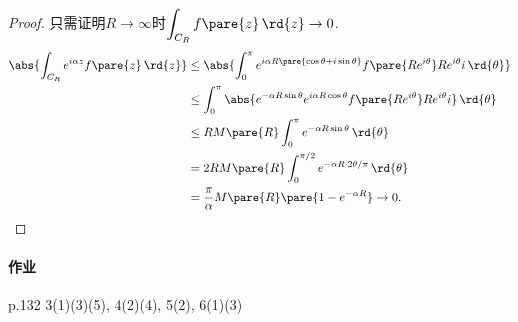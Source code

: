 \documentclass[../ComplexVariable.tex]{subfiles}
\begin{document}
\begin{proof}
    只需证明$R\rightarrow\infty$时$\displaystyle \int_{C_R}f\pare{z}\,\rd{z} \rightarrow 0$.
    \begin{align*}
        \abs{\int_{C_R} e^{i\alpha z}f\pare{z}\,\rd{z}} &\le \abs{\int_0^{\pi} e^{i\alpha R\pare{\cos\theta + i\sin\theta}}f\pare{Re^{i\theta}}Re^{i\theta}i\,\rd{\theta}} \\
        &\le \int_0^\pi \abs{e^{-\alpha R\sin\theta} e^{i\alpha R\cos\theta} f\pare{Re^{i\theta}} Re^{i\theta}i}\,\rd{\theta} \\
        &\le RM\pare{R}\int_0^\pi e^{-\alpha R\sin\theta}\,\rd{\theta} \\
        &= 2RM\pare{R} \int_0^{\pi/2} e^{-\alpha R\cdot 2 \theta/\pi}\,\rd{\theta} \\
        &= \frac{\pi}{\alpha}M\pare{R}\pare{1-e^{-\alpha R}} \rightarrow 0. \qedhere
    \end{align*}
\end{proof}

\paragraph{作业} %
\label{par:作业}

p.132 3(1)(3)(5), 4(2)(4), 5(2), 6(1)(3)

\end{document}
